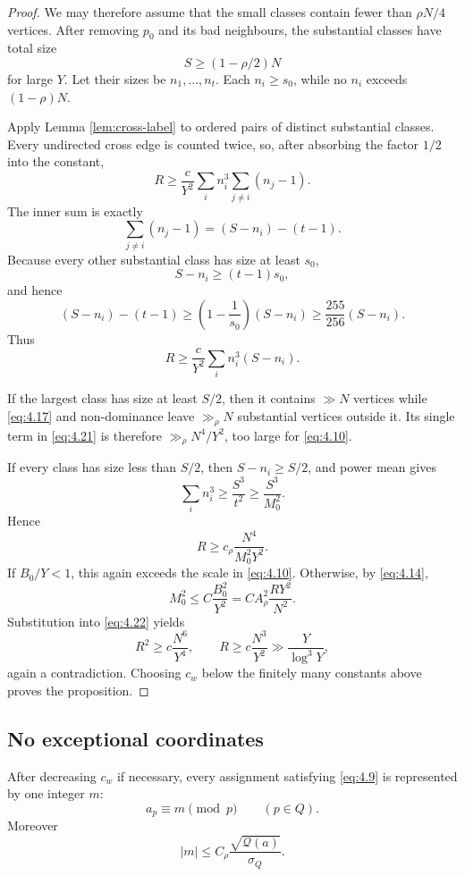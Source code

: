 \begin{proof}
We may therefore assume that the small classes contain fewer than $\rho N/4$ vertices. After removing $p_0$ and its bad neighbours, the substantial classes have total size
\[
S\ge(1-\rho/2)N
\tag{4.17}\label{eq:4.17}
\]
for large $Y$. Let their sizes be $n_1,\ldots,n_t$. Each $n_i\ge s_0$, while no $n_i$ exceeds $(1-\rho)N$.

Apply Lemma \ref{lem:cross-label} to ordered pairs of distinct substantial classes. Every undirected cross edge is counted twice, so, after absorbing the factor $1/2$ into the constant,
\[
R
\ge
\frac{c}{Y^2}
\sum_i n_i^3
\sum_{j\ne i}(n_j-1).
\tag{4.18}\label{eq:4.18}
\]
The inner sum is exactly
\[
\sum_{j\ne i}(n_j-1)
=(S-n_i)-(t-1).
\tag{4.19}\label{eq:4.19}
\]
Because every other substantial class has size at least $s_0$,
\[
S-n_i\ge(t-1)s_0,
\]
and hence
\[
(S-n_i)-(t-1)
\ge
\left(1-\frac1{s_0}\right)(S-n_i)
\ge
\frac{255}{256}(S-n_i).
\tag{4.20}\label{eq:4.20}
\]
Thus
\[
R\ge\frac{c}{Y^2}\sum_i n_i^3(S-n_i).
\tag{4.21}\label{eq:4.21}
\]

If the largest class has size at least $S/2$, then it contains $\gg N$ vertices while \eqref{eq:4.17} and non-dominance leave $\gg_\rho N$ substantial vertices outside it. Its single term in \eqref{eq:4.21} is therefore $\gg_\rho N^4/Y^2$, too large for \eqref{eq:4.10}.

If every class has size less than $S/2$, then $S-n_i\ge S/2$, and power mean gives
\[
\sum_i n_i^3
\ge
\frac{S^3}{t^2}
\ge
\frac{S^3}{M_0^2}.
\]
Hence
\[
R\ge c_\rho\frac{N^4}{M_0^2Y^2}.
\tag{4.22}\label{eq:4.22}
\]
If $B_0/Y<1$, this again exceeds the scale in \eqref{eq:4.10}. Otherwise, by \eqref{eq:4.14},
\[
M_0^2
\le C\frac{B_0^2}{Y^2}
=C A_\rho^2\frac{RY^2}{N^2}.
\]
Substitution into \eqref{eq:4.22} yields
\[
R^2\ge c\frac{N^6}{Y^4},
\qquad
R\ge c\frac{N^3}{Y^2}\gg\frac{Y}{\log^3Y},
\]
again a contradiction. Choosing $c_w$ below the finitely many constants above proves the proposition.
\end{proof}

\subsection{No exceptional coordinates}

\begin{proposition}\label{prop:zero-exception}
After decreasing $c_w$ if necessary, every assignment satisfying \eqref{eq:4.9} is represented by one integer $m$:
\[
a_p\equiv m\pmod p
\qquad(p\in Q).
\tag{4.23}\label{eq:4.23}
\]
Moreover
\[
|m|
\le
C_\rho\frac{\sqrt{\mathcal Q(a)}}{\sigma_Q}.
\tag{4.24}\label{eq:4.24}
\]
\end{proposition}

